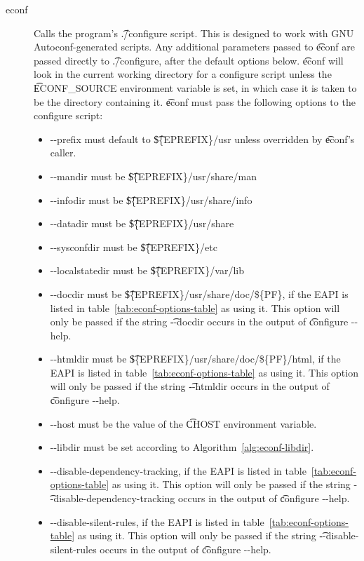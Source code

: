 \begin{description}
\item[econf] Calls the program's \t{./configure} script. This is designed to work with GNU
    Autoconf-generated scripts. Any additional parameters passed to \t{econf} are passed directly
    to \t{./configure}, after the default options below. \t{econf} will look in the current working
    directory for a configure script unless the \t{ECONF\_SOURCE} environment variable is set,
    in which case it is taken to be the directory containing it. \t{econf} must pass the following
    options to the configure script:

    \begin{itemize}
    \item -{}-prefix must default to \t{\$\{EPREFIX\}/usr} unless overridden by \t{econf}'s caller.
    \item -{}-mandir must be \t{\$\{EPREFIX\}/usr/share/man}
    \item -{}-infodir must be \t{\$\{EPREFIX\}/usr/share/info}
    \item -{}-datadir must be \t{\$\{EPREFIX\}/usr/share}
    \item -{}-sysconfdir must be \t{\$\{EPREFIX\}/etc}
    \item -{}-localstatedir must be \t{\$\{EPREFIX\}/var/lib}
    \item -{}-docdir must be \t{\$\{EPREFIX\}/usr/share/doc/\$\{PF\}}, if the EAPI is listed in
        table~\ref{tab:econf-options-table} as using it. This option will only be passed if the
        string \t{-{}-docdir} occurs in the output of \t{configure -{}-help}.
    \item -{}-htmldir must be \t{\$\{EPREFIX\}/usr/share/doc/\$\{PF\}/html}, if the EAPI is listed
        in table~\ref{tab:econf-options-table} as using it. This option will only be passed if the
        string \t{-{}-htmldir} occurs in the output of \t{configure -{}-help}.
    \item -{}-host must be the value of the \t{CHOST} environment variable.
    \item -{}-libdir must be set according to Algorithm~\ref{alg:econf-libdir}.
    \item -{}-disable-dependency-tracking, if the EAPI is listed in
        table~\ref{tab:econf-options-table} as using it. This option will only be passed if the
        string \t{-{}-disable-dependency-tracking} occurs in the output of \t{configure -{}-help}.
    \item -{}-disable-silent-rules, if the EAPI is listed in table~\ref{tab:econf-options-table} as
        using it. This option will only be passed if the string \t{-{}-disable-silent-rules} occurs
        in the output of \t{configure -{}-help}.
    \end{itemize}


\end{description}

